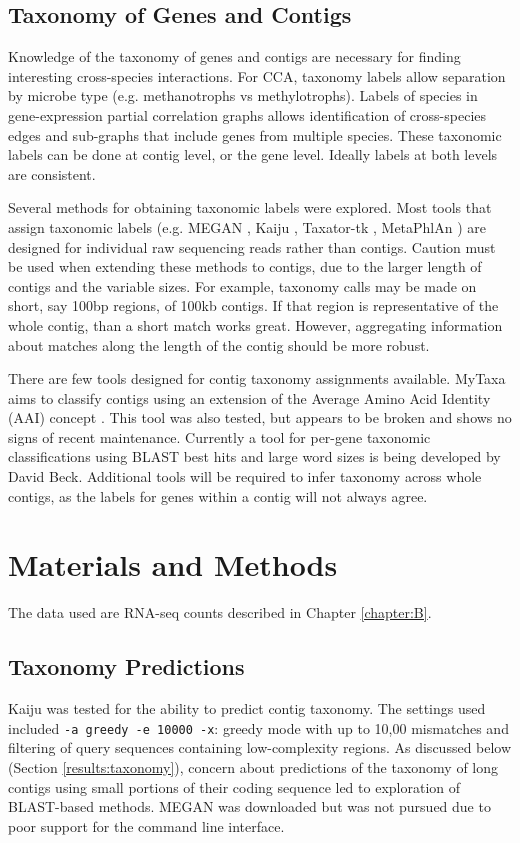 \subsection{Taxonomy of Genes and Contigs}
Knowledge of the taxonomy of genes and contigs are necessary for finding interesting cross-species interactions.
For CCA, taxonomy labels allow separation by microbe type (e.g. methanotrophs vs methylotrophs).
Labels of species in gene-expression partial correlation graphs allows identification of cross-species edges and sub-graphs that include genes from multiple species.
These taxonomic labels can be done at contig level, or the gene level.
Ideally labels at both levels are consistent.

Several methods for obtaining taxonomic labels were explored.
Most tools that assign taxonomic labels (e.g. MEGAN \cite{huson2015}, Kaiju \cite{menzel2016}, Taxator-tk \cite{droge2014}, MetaPhlAn \cite{segata2012}) are designed for individual raw sequencing reads rather than contigs.
Caution must be used when extending these methods to contigs, due to the larger length of contigs and the variable sizes.
For example, taxonomy calls may be made on short, say 100bp regions, of 100kb contigs.
If that region is representative of the whole contig, than a short match works great.
However, aggregating information about matches along the length of the contig should be more robust.

There are few tools designed for contig taxonomy assignments available.
MyTaxa aims to classify contigs using an extension of the Average Amino Acid Identity (AAI) concept \cite{konstantinidis2005}.
This tool was also tested, but appears to be broken and shows no signs of recent maintenance.
Currently a tool for per-gene taxonomic classifications using BLAST best hits and large word sizes is being developed by David Beck.
Additional tools will be required to infer taxonomy across whole contigs, as the labels for genes within a contig will not always agree.


\section{Materials and Methods}

The data used are RNA-seq counts described in Chapter \ref{chapter:B}.

\subsection{Taxonomy Predictions}
Kaiju \cite{menzel2016} was tested for the ability to predict contig taxonomy.
The settings used included \texttt{-a greedy -e 10000 -x}: greedy mode with up to 10,00 mismatches and filtering of query sequences containing low-complexity regions.
As discussed below (Section \ref{results:taxonomy}), concern about predictions of the taxonomy of long contigs using small portions of their coding sequence led to exploration of BLAST-based methods.
MEGAN was downloaded but was not pursued due to poor support for the command line interface.


